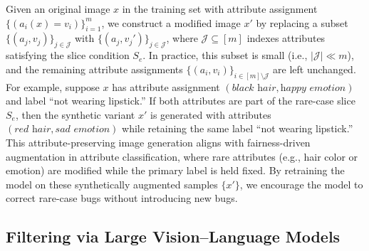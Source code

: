 \documentclass[10pt]{article} %
\begin{document}
Given an original image \(x\) in the training set with attribute assignment \(\{(a_i(x) =  v_i)\}_{i=1}^m\), we construct a modified image \(x'\) by replacing a subset \(\{(a_j, v_j)\}_{j \in \mathcal{J}}\) with \(\{(a_j, v_j')\}_{j \in \mathcal{J}}\), where \(\mathcal{J} \subseteq [m]\) indexes attributes satisfying the slice condition \(S_e\). In practice, this subset is small (i.e., \(|\mathcal{J}| \ll m\)), and the remaining attribute assignments \(\{(a_i, v_i)\}_{i \in [m] \setminus \mathcal{J}}\) are left unchanged. 
For example, suppose \(x\) has attribute assignment \((\textit{black hair}, \textit{happy emotion})\) and label “not wearing lipstick.” If both attributes are part of the rare-case slice \(S_e\), then the synthetic variant \(x'\) is generated with attributes \((\textit{red hair}, \textit{sad emotion})\) while retaining the same label “not wearing lipstick.” This attribute-preserving image generation aligns with fairness-driven augmentation in attribute classification, where rare attributes (e.g., hair color or emotion) are modified while the primary label is held fixed. By retraining the model on these synthetically augmented samples \(\{x'\}\), we encourage the model to correct rare-case bugs without introducing new bugs.





\subsection{Filtering via Large Vision--Language Models}
\end{document}
